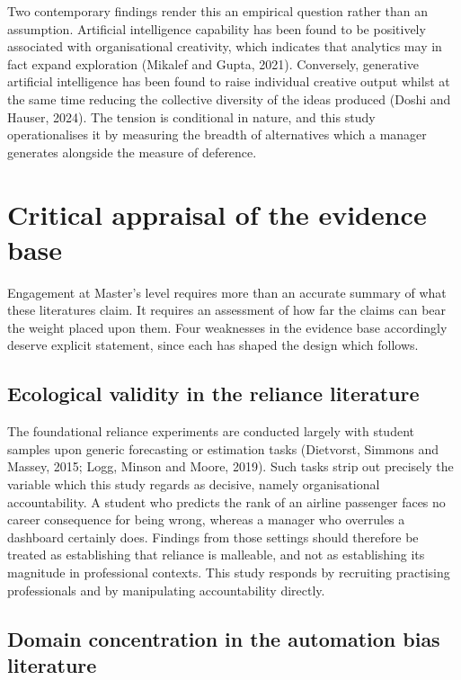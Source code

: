 \documentclass[12pt,a4paper]{article}
\begin{document}
Two contemporary findings render this an empirical question rather than an assumption. Artificial
intelligence capability has been found to be positively associated with organisational creativity, which
indicates that analytics may in fact expand exploration (Mikalef and Gupta, 2021). Conversely, generative
artificial intelligence has been found to raise individual creative output whilst at the same time reducing
the collective diversity of the ideas produced (Doshi and Hauser, 2024). The tension is conditional in
nature, and this study operationalises it by measuring the breadth of alternatives which a manager
generates alongside the measure of deference.

\section{Critical appraisal of the evidence base}

Engagement at Master's level requires more than an accurate summary of what these literatures
claim. It requires an assessment of how far the claims can bear the weight placed upon them. Four
weaknesses in the evidence base accordingly deserve explicit statement, since each has shaped the
design which follows.

\subsection{Ecological validity in the reliance literature}

The foundational reliance experiments are conducted largely with student samples upon generic
forecasting or estimation tasks (Dietvorst, Simmons and Massey, 2015; Logg, Minson and Moore,
2019). Such tasks strip out precisely the variable which this study regards as decisive, namely
organisational accountability. A student who predicts the rank of an airline passenger faces no
career consequence for being wrong, whereas a manager who overrules a dashboard certainly does.
Findings from those settings should therefore be treated as establishing that reliance is
malleable, and not as establishing its magnitude in professional contexts. This study responds by
recruiting practising professionals and by manipulating accountability directly.

\subsection{Domain concentration in the automation bias literature}
\end{document}
